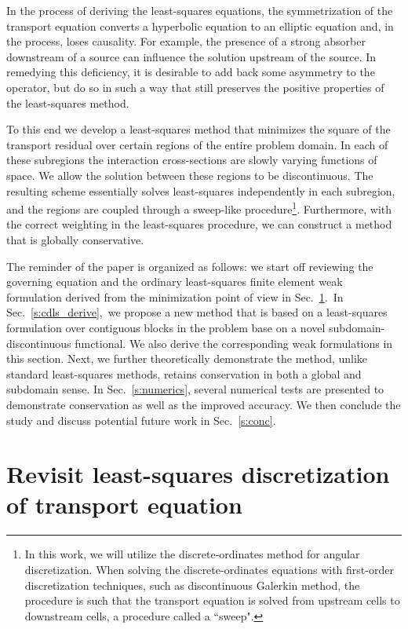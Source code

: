 \documentclass[review]{elsarticle}
\begin{document}
In the process of deriving the least-squares equations, the symmetrization of the transport equation converts a hyperbolic equation to an elliptic equation and, in the process, loses causality. For example, the presence of a strong absorber downstream of a source can influence the solution upstream of the source. In remedying this deficiency, {it is desirable} to add back some asymmetry to the operator, but do so in such a way that still preserves the positive properties of the least-squares method.

To this end we develop a least-squares method that minimizes the square of the transport residual over certain regions of the entire problem domain. In each of these subregions the interaction cross-sections are slowly varying functions of space. We allow the solution between these regions to be discontinuous. The resulting scheme essentially solves least-squares independently in each subregion, and the regions are coupled through a sweep-like procedure\footnote{{In this work, we will utilize the discrete-ordinates method for angular discretization. When solving the discrete-ordinates equations with first-order discretization techniques, such as discontinuous Galerkin method, the procedure is such that the transport equation is solved from upstream cells to downstream cells, a procedure called a ``sweep".}}. Furthermore, with the correct weighting in the least-squares procedure, we can construct a method that is globally conservative.

The reminder of the paper is organized as follows: {we start off reviewing the governing equation and the ordinary least-squares finite element weak formulation derived from the minimization point of view in Sec.\ \ref{s:ls}}.\ In Sec.\ \ref{s:cdls_derive},\ we propose a new method that is based on a least-squares formulation over contiguous blocks in the problem base on a novel subdomain-discontinuous functional. We also derive the corresponding weak formulations in this section. Next, we further theoretically demonstrate the method, unlike standard least-squares methods, retains conservation in both a global and subdomain sense. In Sec.\ \ref{s:numerics}, several numerical tests are presented to demonstrate conservation as well as the improved accuracy. {We then conclude the study and discuss potential future work in Sec.\ \ref{s:conc}.}


\section{Revisit least-squares discretization of transport equation}\label{s:ls}
\end{document}
